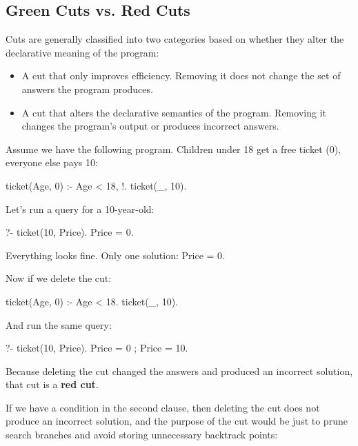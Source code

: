\subsection{Green Cuts vs. Red Cuts}
Cuts are generally classified into two categories based on whether they alter the declarative meaning of the program:
\begin{itemize}
    \item {} A cut that only improves efficiency. Removing it does not change the set of answers the program produces.
    \item {} A cut that alters the declarative semantics of the program. Removing it changes the program's output or produces incorrect answers.
\end{itemize}

Assume we have the following program. Children under 18 get a free ticket (0), everyone else pays 10:

\begin{codeblock}
ticket(Age, 0) :- Age < 18, !.
ticket(_, 10).
\end{codeblock}

Let's run a query for a 10-year-old:

\begin{codeblock}
?- ticket(10, Price).
Price = 0.
\end{codeblock}

Everything looks fine. Only one solution: Price = 0.

Now if we delete the cut:
\begin{codeblock}
ticket(Age, 0) :- Age < 18.
ticket(_, 10).
\end{codeblock}

And run the same query:
\begin{codeblock}
?- ticket(10, Price).
Price = 0 ;
Price = 10.
\end{codeblock}


Because deleting the cut changed the answers and produced an incorrect solution, that cut is a \textbf{red cut}.

If we have a condition in the second clause, then deleting the cut does not produce an incorrect solution, and the purpose of the cut would be just to prune search branches and avoid storing unnecessary backtrack points:

